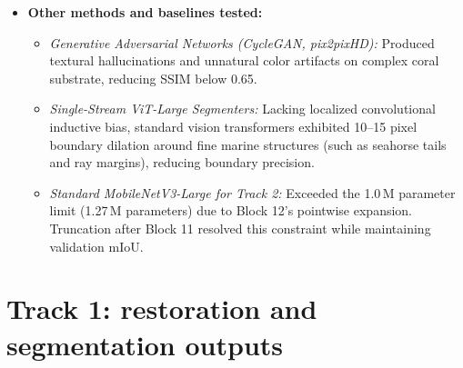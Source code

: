 \documentclass{article}
\begin{document}
\begin{itemize}[leftmargin=*]
  We highlight four engineering decisions developed for the EURS benchmark constraints:
  (1) An 18-D radiometric router evaluating precomputed polynomial basis coefficients in $<0.30$\,GFLOPs, substituting spatial 2D convolutions with global statistical routing for low-power edge restoration.
  (2) An asymmetric dual-stream encoder coupling self-supervised transformer representations (DINOv3) on restored RGB with convolutional inductive bias (ConvNeXt-Base) on raw degraded RGB via learned spatial gating, addressing token-level boundary smoothing.
  (3) An in-graph convolutional average pooling filter embedded directly into the ONNX graph, suppressing isolated rare-class false positives natively inside TensorRT FP16 without CPU synchronization overhead.
  (4) An empirical logit calibration offset ($\Delta Z$) mitigating the zero-true-positive score collapse induced by the multiplicative Coverage Penalty on rare classes. \\
  The pipeline was developed for the EURS Challenge at MaCVi@WACV 2027 and has not been previously published.
\item \textbf{Other methods and baselines tested:}
  \begin{itemize}
    \item \emph{Generative Adversarial Networks (CycleGAN, pix2pixHD):} Produced textural hallucinations and unnatural color artifacts on complex coral substrate, reducing SSIM below 0.65.
    \item \emph{Single-Stream ViT-Large Segmenters:} Lacking localized convolutional inductive bias, standard vision transformers exhibited 10--15 pixel boundary dilation around fine marine structures (such as seahorse tails and ray margins), reducing boundary precision.
    \item \emph{Standard MobileNetV3-Large for Track 2:} Exceeded the 1.0\,M parameter limit (1.27\,M parameters) due to Block 12's pointwise expansion. Truncation after Block 11 resolved this constraint while maintaining validation mIoU.
  \end{itemize}
\end{itemize}

\section{Track 1: restoration and segmentation outputs}\label{sec:t1}
\end{document}
